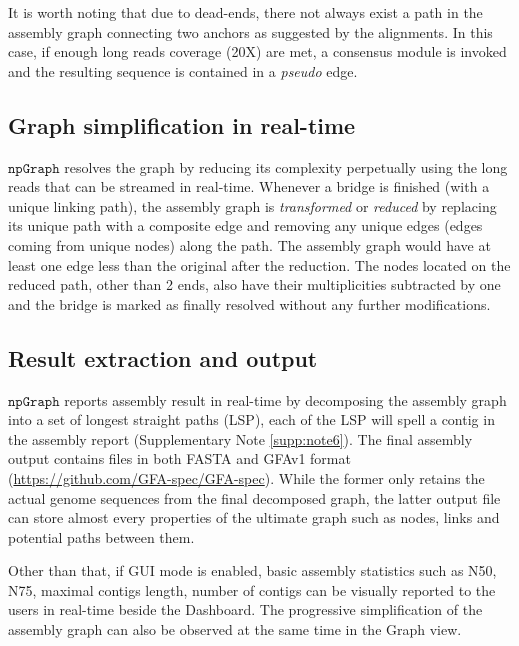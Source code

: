 \documentclass[10pt,twocolumn,twoside]{genpaper}
\newcommand{\npgraph}{$\mathtt{npGraph}$}
\begin{document}
It is worth noting that due to dead-ends, there not always exist a path in the assembly graph connecting two anchors as suggested by the alignments. In this case, if enough long reads coverage (20X) are met, a consensus module is invoked and the resulting sequence is contained in a \emph{pseudo} edge.
\subsection*{Graph simplification in real-time}
\npgraph{} resolves the graph by reducing its complexity perpetually using the long reads that can be streamed in real-time.
Whenever a bridge is finished (with a unique linking path), the assembly graph is \emph{transformed} or \emph{reduced} by replacing its unique path with a composite edge and removing any unique edges (edges coming from unique nodes) along the path. The assembly graph would have at least one edge less than the original after the reduction. The nodes located on the reduced path, other than 2 ends, also have their multiplicities subtracted by one and the bridge is marked as finally resolved without any further modifications. 

\subsection*{Result extraction and output}
\npgraph{} reports assembly result in real-time by decomposing the assembly graph into a set of longest straight paths (LSP), each of the LSP will spell a contig in the assembly report (Supplementary Note \ref{supp:note6}).
The final assembly output contains files in both FASTA and GFAv1 format (\url{https://github.com/GFA-spec/GFA-spec}). While the former only retains the actual genome sequences from the final decomposed graph, the latter output file can store almost every properties of the ultimate graph such as nodes, links and potential paths between them.

Other than that, if GUI mode is enabled, basic assembly statistics such as N50, N75, maximal contigs length, number of contigs can be visually reported to the users in real-time beside the Dashboard. The progressive simplification of the assembly graph can also be observed at the same time in the Graph view.


 
\end{document}
